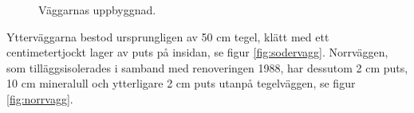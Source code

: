 \begin{figure}[hpbt]
\centering
{}%

\caption{\label{fig:wall_dec} Väggarnas uppbyggnad.}
\end{figure}

Ytterväggarna bestod ursprungligen av 50 cm tegel, klätt med ett centimetertjockt lager av puts på insidan, se figur \ref{fig:sodervagg}. Norrväggen, som tilläggsisolerades i samband med renoveringen 1988, har dessutom 2 cm puts, 10 cm mineralull och ytterligare 2 cm puts utanpå tegelväggen, se figur \ref{fig:norrvagg}.\cite{kandidatarbete2010}\cite{petersarneo}

